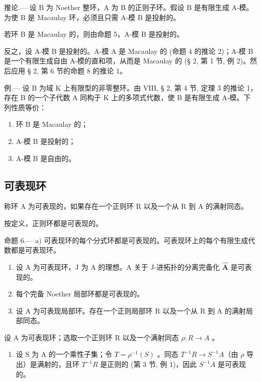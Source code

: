 推论.--- 设 B 为 Noether 整环，A 为 B 的正则子环。假设 B 是有限生成 A-模。为使 B 是 Macaulay 环，必须且只需 A-模 B 是投射的。

若环 B 是 Macaulay 的，则由命题 5，A-模 B 是投射的。

反之，设 A-模 B 是投射的。A-模 A 是 Macaulay 的 (命题 4 的推论 2)；A-模 B 是一个有限生成自由 A-模的直和项，从而是 Macaulay 的 (§ 2, 第 1 节, 例 2)。然后应用 § 2, 第 6 节的命题 8 的推论 1。

例.--- 设 B 为域 K 上有限型的非零整环。由 VIII, § 2, 第 4 节, 定理 3 的推论 1，存在 B 的一个子代数 A 同构于 K 上的多项式代数，使 B 是有限生成 A-模。下列性质等价：

\begin{enumerate}
\def\labelenumi{(\roman{enumi})}
\item
  环 B 是 Macaulay 的；
\item
  A-模 B 是投射的；
\item
  A-模 B 是自由的。
\end{enumerate}

\subsection{可表现环}

称环 A 为可表现的，如果存在一个正则环 R 以及一个从 R 到 A 的满射同态。

按定义，正则环都是可表现的。

命题 6.--- a) 可表现环的每个分式环都是可表现的。可表现环上的每个有限生成代数都是可表现环。

\begin{enumerate}
\def\labelenumi{\alph{enumi})}
\setcounter{enumi}{1}
\item
  设 A 为可表现环，J 为 A 的理想。A 关于 J-进拓扑的分离完备化 \(\widehat{\mathbf{A}}\) 是可表现的。
\item
  每个完备 Noether 局部环都是可表现的。
\item
  设 A 为可表现局部环。存在一个正则局部环 R 以及一个从 R 到 A 的满射局部同态。
\end{enumerate}

设 A 为可表现环；选取一个正则环 R 以及一个满射同态 \(\rho: R \to A\) 。

\begin{enumerate}
\def\labelenumi{\alph{enumi})}
\tightlist
\item
  设 S 为 A 的一个乘性子集；令 \(T = \rho^{-1}(S)\) 。同态 \(T^{-1}R \to S^{-1}A\)（由 \(\rho\) 导出）是满射的，且环 \(T^{-1}R\) 是正则的 (第 3 节, 例 1)，因此 \(S^{-1}A\) 是可表现的。
\end{enumerate}

